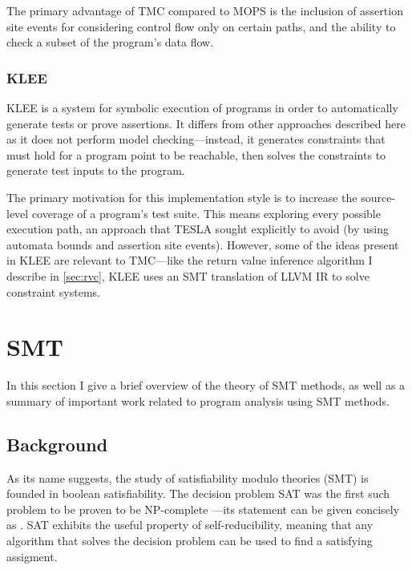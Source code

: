 The primary advantage of TMC compared to MOPS is the inclusion of assertion site
events for considering control flow only on certain paths, and the ability to
check a subset of the program's data flow.

\subsubsection{KLEE}

KLEE \cite{cadar_klee:_2008} is a system for symbolic execution of programs in
order to automatically generate tests or prove assertions. It differs from other
approaches described here as it does not perform model checking---instead, it
generates constraints that must hold for a program point to be reachable, then
solves the constraints to generate test inputs to the program.

The primary motivation for this implementation style is to increase the
source-level coverage of a program's test suite. This means exploring every
possible execution path, an approach that TESLA sought explicitly to avoid (by
using automata bounds and assertion site events). However, some of the ideas
present in KLEE are relevant to TMC---like the return value inference algorithm
I describe in \autoref{sec:rvc}, KLEE uses an SMT translation of LLVM IR to
solve constraint systems.

\section{SMT} \label{sec:smt}

In this section I give a brief overview of the theory of SMT methods, as well as
a summary of important work related to program analysis using SMT methods.

\subsection{Background}

As its name suggests, the study of satisfiability modulo theories (SMT) is
founded in boolean satisfiability. The decision problem SAT was the first such
problem to be proven to be NP-complete \cite{cook_complexity_1971}---its
statement can be given concisely as . SAT exhibits the useful property of self-reducibility,
meaning that any algorithm that solves the decision problem can be used to find
a satisfying assigment.

